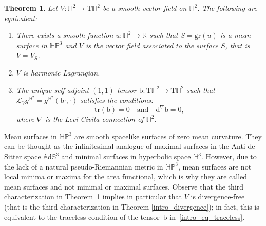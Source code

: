 \documentclass[11pt]{article}
\theoremstyle{plain}
\newtheorem{theorem}[cor]{Theorem}
\theoremstyle{definition}
\newcommand{\bb}{\mathrm{b}}
\newcommand{\ads}{\mathbb{A}\mathrm{d}\mathbb{S}^3}
\newcommand{\HP}{\mathbb{HP}^3}
\begin{document}
\begin{theorem}\label{intro_chara}
Let \(V: \mathbb{H}^2 \to \mathrm{T}\mathbb{H}^2\) be a smooth vector field on \(\mathbb{H}^2\). The following are equivalent:
\begin{enumerate}
\item There exists a smooth function \(u: \mathbb{H}^2 \to \mathbb{R}\) such that \(S=\mathrm{gr}(u)\) is a mean surface in \(\HP\) and \(V\) is the vector field associated to the surface \(S\), that is \(V = V_S\).
\item \(V\) is harmonic Lagrangian.
\item The unique self-adjoint \((1, 1)\)-tensor \(\bb: \mathrm{T}\mathbb{H}^2 \to \mathrm{T}\mathbb{H}^2\) such that \(\mathcal{L}_V g^{\mathbb{H}^2} = g^{\mathbb{H}^2}(\bb \cdot, \cdot)\) satisfies the conditions:
\begin{equation}\label{intro_eq_traceless}
\mathrm{tr}(\bb) = 0 \quad \text{and} \quad \mathrm{d}^{\nabla} \bb = 0,
\end{equation}
where \(\nabla\) is the Levi-Civita connection of \(\mathbb{H}^2\).
\end{enumerate}
\end{theorem}
Mean surfaces in \(\HP\) are smooth spacelike surfaces of zero mean curvature. They can be thought as the infinitesimal analogue of maximal surfaces in the Anti-de Sitter space \(\ads\) and minimal surfaces in hyperbolic space $\mathbb{H}^3$. However, due to the lack of a natural pseudo-Riemannian metric in \(\HP\), mean surfaces are not local minima or maxima for the area functional, which is why they are called mean surfaces and not minimal or maximal surfaces. Observe that the third characterization in Theorem~\ref{intro_chara} implies in particular that \(V\) is divergence-free (that is the third characterization in Theorem \ref{intro_divergence}); in fact, this is equivalent to the traceless condition of the tensor~\(\bb\) in~\eqref{intro_eq_traceless}.
\end{document}
